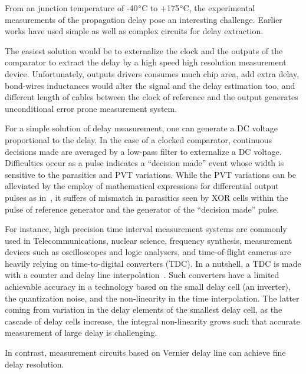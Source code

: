 From an junction temperature of -40\(\degree \)C to +175\(\degree \)C, the experimental measurements of the propagation delay pose an interesting challenge. Earlier works have used simple as well as complex circuits for delay extraction. 

The easiest solution would be to externalize the clock and the outputs of the comparator to extract the delay by a high speed high resolution measurement device. Unfortunately, outputs drivers consumes much chip area, add extra delay, bond-wires inductances would alter the signal and the delay estimation too, and different length of cables between the clock of reference and the output generates unconditional error prone measurement system.

For a simple solution of delay measurement, one can generate a DC voltage proportional to the delay. In the case of a clocked comparator, continuous decisions made are averaged by a low-pass filter to externalize a DC voltage. Difficulties occur as a pulse indicates a ``decision made'' event whose width is sensitive to the parasitics and PVT variations. While the PVT variations can be alleviated by the employ of mathematical expressions for differential output pulses as in~\cite{1706643}, it suffers of mismatch in parasitics seen by XOR cells within the pulse of reference generator and the generator of the ``decision made'' pulse.

For instance, high precision time interval measurement systems are commonly used in Telecommunications, nuclear science, frequency synthesis, measurement devices such as oscilloscopes and logic analysers, and time-of-flight cameras are heavily relying on time-to-digital converters (TDC). In a nutshell, a TDC is made with a counter and delay line interpolation~\cite{1637593}. Such converters have a limited achievable accuracy in a technology based on the small delay cell (an inverter), the quantization noise, and the non-linearity in the time interpolation. The latter coming from variation in the delay elements of the smallest delay cell, as the cascade of delay cells increase, the integral non-linearity grows such that accurate measurement of large delay is challenging.

In contrast, measurement circuits based on Vernier delay line can achieve fine delay resolution.

